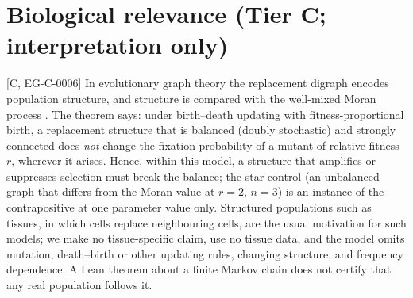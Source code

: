 \documentclass[11pt]{article}
\newcommand{\tier}[1]{\textsf{[#1]}}
\begin{document}
\section{Biological relevance (Tier C; interpretation only)}\label{sec:bio}
\tier{C, EG-C-0006} In evolutionary graph theory the replacement digraph encodes population structure, and structure is compared with the well-mixed Moran process \cite{PBRS}. The theorem says: under birth--death updating with fitness-proportional birth, a replacement structure that is balanced (doubly stochastic) and strongly connected does \emph{not} change the fixation probability of a mutant of relative fitness $r$, wherever it arises. Hence, within this model, a structure that amplifies or suppresses selection must break the balance; the star control (an unbalanced graph that differs from the Moran value at $r=2$, $n=3$) is an instance of the contrapositive at one parameter value only. Structured populations such as tissues, in which cells replace neighbouring cells, are the usual motivation for such models; we make no tissue-specific claim, use no tissue data, and the model omits mutation, death--birth or other updating rules, changing structure, and frequency dependence. A Lean theorem about a finite Markov chain does not certify that any real population follows it.

\end{document}
